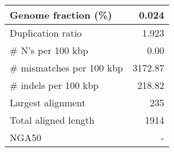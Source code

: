 \documentclass[12pt,a4paper]{article}
\begin{document}
\begin{table}[ht]
\begin{center}
\begin{tabular}{|l*{1}{|r}|}
Genome fraction (\%) & 0.024 \\ \hline
Duplication ratio & 1.923 \\ \hline
\# N's per 100 kbp & 0.00 \\ \hline
\# mismatches per 100 kbp & 3172.87 \\ \hline
\# indels per 100 kbp & 218.82 \\ \hline
Largest alignment & 235 \\ \hline
Total aligned length & 1914 \\ \hline
NGA50 & - \\ \hline
\end{tabular}
\end{center}
\end{table}
\end{document}
